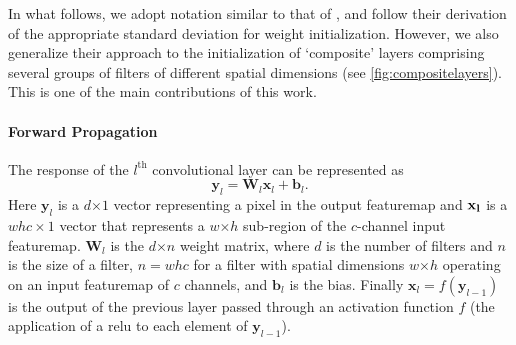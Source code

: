 \documentclass[thesis]{subfiles}
\begin{document}
    In what follows, we adopt notation similar to that of \citet{He2015b}, and follow their derivation of the appropriate standard deviation for weight initialization. However, we also generalize their approach to the initialization of `composite' layers comprising several groups of filters of different spatial dimensions (see \cref{fig:compositelayers}). This is one of the main contributions of this work.
    
    \paragraph{Forward Propagation}
    The response of the $l^\text{th}$ convolutional layer can be represented as
    \begin{equation}
    \mathbf{y}_l =\mathbf{W}_l \mathbf{x}_l + \mathbf{b}_l.
    \end{equation}
    Here $\mathbf{y}_l$ is a $d$$\times$$1$ vector representing a pixel in the output \gls{featuremap} and $\bf x_l$ is a $ w h c \times 1$ vector that represents a $w$$\times$$h$ sub-region of the $c$-channel input \gls{featuremap}. $\mathbf{W}_l$ is the $d$$\times$$n$ weight matrix, where $d$ is the number of filters and $n$ is the size of a filter, \ie $n = w h c$ for a filter with spatial dimensions $w$$\times$$h$ operating on an input \gls{featuremap} of $c$ channels, and $\mathbf{b}_l$ is the bias. Finally $\mathbf{x}_l = f(\mathbf{y}_{l-1})$ is the output of the previous layer passed through an activation function $f$ (\eg the application of a \gls{relu} to each element of $\mathbf{y}_{l-1}$).
    
\end{document}
